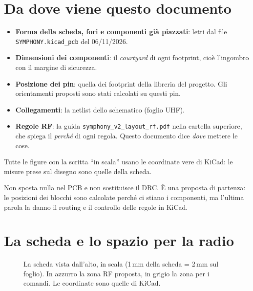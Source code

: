 \documentclass[a4paper,11pt]{article}
\begin{document}
\section{Da dove viene questo documento}
\begin{itemize}
\item \textbf{Forma della scheda, fori e componenti già piazzati}: letti dal file \texttt{SYMPHONY.kicad\_pcb} del 06/11/2026.
\item \textbf{Dimensioni dei componenti}: il \emph{courtyard} di ogni footprint, cioè l'ingombro con il margine di sicurezza.
\item \textbf{Posizione dei pin}: quella dei footprint della libreria del progetto. Gli orientamenti proposti sono stati calcolati su questi pin.
\item \textbf{Collegamenti}: la netlist dello schematico (foglio UHF).
\item \textbf{Regole RF}: la guida \texttt{symphony\_v2\_layout\_rf.pdf} nella cartella superiore, che spiega il \emph{perché} di ogni regola. Questo documento dice \emph{dove} mettere le cose.
\end{itemize}

Tutte le figure con la scritta \enquote{in scala} usano le coordinate vere di KiCad: le misure prese sul disegno sono quelle della scheda.

\begin{nota}
Non sposta nulla nel PCB e non sostituisce il DRC. È una proposta di partenza: le posizioni dei blocchi sono calcolate perché ci stiano i componenti, ma l'ultima parola la danno il routing e il controllo delle regole in KiCad.
\end{nota}

\section{La scheda e lo spazio per la radio}

\begin{figure}[H]
\centering

\caption{La scheda vista dall'alto, in scala (1\,mm della scheda = 2\,mm sul foglio). In azzurro la zona RF proposta, in grigio la zona per i comandi. Le coordinate sono quelle di KiCad.}
\label{fig:scheda}
\end{figure}
\end{document}
